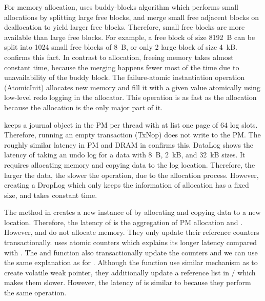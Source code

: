 For memory allocation, \This{} uses buddy-blocks algorithm which performs small allocations by splitting large free blocks, and merge small free adjacent blocks on deallocation to yield larger free blocks. Therefore, small free blocks are more available than large free blocks. For example, a free block of size 8192~B can be split into 1024 small free blocks of 8~B, or only 2 large block of size 4~kB.  confirms this fact. In contrast to allocation, freeing memory takes almost constant time, because the merging happens fewer most of the time due to unavailability of the buddy block. The failure-atomic instantiation operation (AtomicInit) allocates new memory and fill it with a given value atomically using low-level redo logging in the allocator. This operation is as fast as the allocation because the allocation is the only major part of it.

\This{} keeps a journal object in the PM per thread with at list one page of 64 log slots. Therefore, running an empty transaction (TxNop) does not write to the PM. The roughly similar latency in PM and DRAM in  confirms this. DataLog shows the latency of taking an undo log for a data with 8~B, 2~kB, and 32~kB sizes. It requires allocating memory and copying data to the log location. Therefore, the larger the data, the slower the operation, due to the allocation process. However, creating a DropLog which only keeps the information of allocation has a fixed size, and takes constant time.

The  method in  creates a new instance of  by allocating and copying data to a new location. Therefore, the latency of  is the aggregation of PM allocation and . However,  and  do not allocate memory. They only update their reference counters transactionally.  uses atomic counters which explains its longer latency compared with . The  and  function also transactionally update the counters and we can use the same explanation as for . Although the  function use similar mechanism as  to create volatile weak pointer, they additionally update a reference list in / which makes them slower. However, the latency of  is similar to  because they perform the same operation.